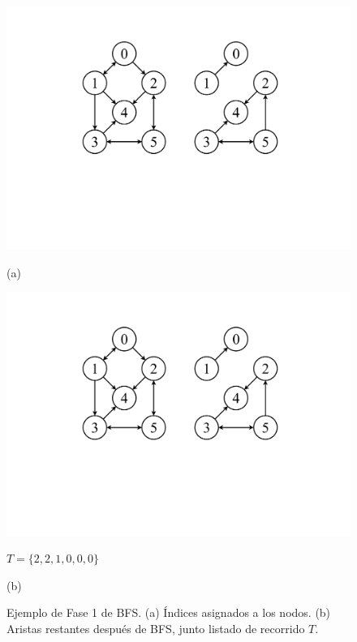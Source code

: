 \begin{figure}%
    	\centering
    	\begin{minipage}{0.45\textwidth}
    		\centering
    		\includegraphics[scale=.35, clip, trim=180 230 440 80 ]{img/arte/graphs-BFS-F1.pdf}
    		
    		(a)
    	\end{minipage}
    	\begin{minipage}{0.45\textwidth}
    		\centering
    		\includegraphics[scale=.35, clip, trim=450 230 170 80]{img/arte/graphs-BFS-F1.pdf}
    		
    		$T = \{2, 2, 1, 0, 0, 0\}$
    		
    		(b)
    	\end{minipage}

    \caption{Ejemplo de Fase 1 de BFS. (a) Índices asignados a los nodos. (b) Aristas restantes después de BFS, junto listado de recorrido $T$.}
    \label{fig:bfs1}
\end{figure}

